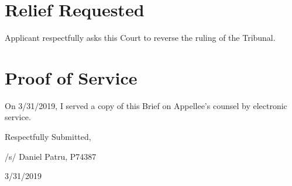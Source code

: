 \documentclass[12pt,\documentclassflag]{michiganCourtOfAppealsBrief}
\begin{document}
\section{Relief Requested}

Applicant respectfully asks this Court to reverse the ruling of the Tribunal. 

\section{Proof of Service}

On 3/31/2019, I served a copy of this Brief on Appellee's counsel by electronic service.

\vspace{1\baselineskip}

{ \setlength{\leftskip}{3.5in}

  Respectfully Submitted,

  /s/ Daniel Patru, P74387

  3/31/2019

  \setlength{\leftskip}{0pt}}

\newpage\empty%
\end{document}
